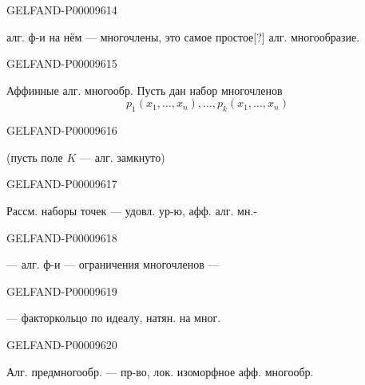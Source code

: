 \begin{GelfandAdjacentEvidence}{GELFAND-P000096}{14}

алг. ф-и на нём — многочлены, это самое простое[?]
алг. многообразие.
\end{GelfandAdjacentEvidence}
\begin{GelfandAdjacentEvidence}{GELFAND-P000096}{15}

Аффинные алг. многообр. Пусть дан набор
многочленов
\begin{equation*}p_1(x_1,\ldots,x_n),\ldots,p_k(x_1,\ldots,x_n)\end{equation*}
\end{GelfandAdjacentEvidence}
\begin{GelfandAdjacentEvidence}{GELFAND-P000096}{16}

(пусть поле $K$ — алг. замкнуто)
\end{GelfandAdjacentEvidence}
\begin{GelfandAdjacentEvidence}{GELFAND-P000096}{17}

Рассм. наборы точек — удовл. ур-ю, афф. алг. мн.-
\end{GelfandAdjacentEvidence}
\begin{GelfandAdjacentEvidence}{GELFAND-P000096}{18}

— алг. ф-и — ограничения многочленов —
\end{GelfandAdjacentEvidence}
\begin{GelfandAdjacentEvidence}{GELFAND-P000096}{19}

— факторкольцо по идеалу, натян. на мног.
\end{GelfandAdjacentEvidence}
\begin{GelfandAdjacentEvidence}{GELFAND-P000096}{20}

Алг. предмногообр. — пр-во, лок. изоморфное
афф. многообр.
\end{GelfandAdjacentEvidence}




